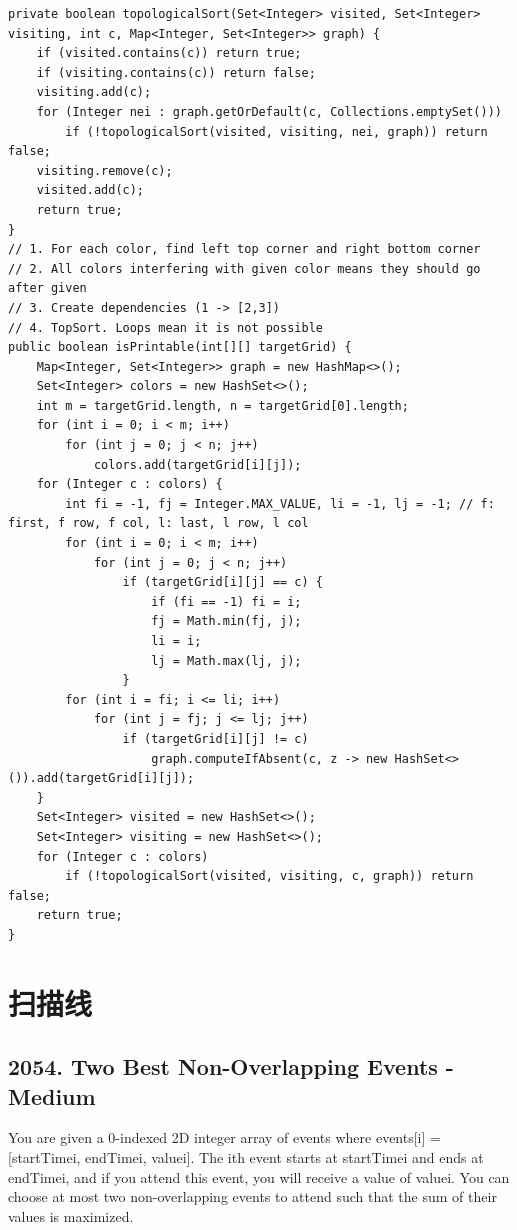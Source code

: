 \documentclass[9pt, b5paaper]{book}
\begin{document}
\begin{verbatim}
private boolean topologicalSort(Set<Integer> visited, Set<Integer> visiting, int c, Map<Integer, Set<Integer>> graph) {
    if (visited.contains(c)) return true;
    if (visiting.contains(c)) return false;
    visiting.add(c);
    for (Integer nei : graph.getOrDefault(c, Collections.emptySet())) 
        if (!topologicalSort(visited, visiting, nei, graph)) return  false;
    visiting.remove(c);
    visited.add(c);
    return true;
}
// 1. For each color, find left top corner and right bottom corner
// 2. All colors interfering with given color means they should go after given
// 3. Create dependencies (1 -> [2,3])
// 4. TopSort. Loops mean it is not possible
public boolean isPrintable(int[][] targetGrid) {
    Map<Integer, Set<Integer>> graph = new HashMap<>();
    Set<Integer> colors = new HashSet<>();
    int m = targetGrid.length, n = targetGrid[0].length;
    for (int i = 0; i < m; i++) 
        for (int j = 0; j < n; j++) 
            colors.add(targetGrid[i][j]);
    for (Integer c : colors) {
        int fi = -1, fj = Integer.MAX_VALUE, li = -1, lj = -1; // f: first, f row, f col, l: last, l row, l col
        for (int i = 0; i < m; i++) 
            for (int j = 0; j < n; j++) 
                if (targetGrid[i][j] == c) {
                    if (fi == -1) fi = i;
                    fj = Math.min(fj, j);
                    li = i;
                    lj = Math.max(lj, j);
                }
        for (int i = fi; i <= li; i++) 
            for (int j = fj; j <= lj; j++) 
                if (targetGrid[i][j] != c) 
                    graph.computeIfAbsent(c, z -> new HashSet<>()).add(targetGrid[i][j]);
    }
    Set<Integer> visited = new HashSet<>();
    Set<Integer> visiting = new HashSet<>();
    for (Integer c : colors) 
        if (!topologicalSort(visited, visiting, c, graph)) return false;
    return true;
}
\end{verbatim}


\chapter{扫描线}
\label{sec-19}
\section{2054. Two Best Non-Overlapping Events - Medium}
\label{sec-19-1}
You are given a 0-indexed 2D integer array of events where events[i] = [startTimei, endTimei, valuei]. The ith event starts at startTimei and ends at endTimei, and if you attend this event, you will receive a value of valuei. You can choose at most two non-overlapping events to attend such that the sum of their values is maximized.
\end{document}
